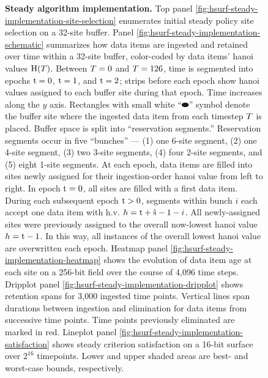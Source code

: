 \begin{figure}[htbp!]
\vspace{-2ex}\caption{%
  \textbf{Steady algorithm implementation.}
  \footnotesize
  Top panel \ref{fig:hsurf-steady-implementation-site-selection} enumerates initial steady policy site selection on a 32-site buffer.
  Panel \ref{fig:hsurf-steady-implementation-schematic} summarizes how data items are ingested and retained over time within a 32-site buffer, color-coded by data items' hanoi values $\colorH(\colorT)$.
  Between $\colorT=0$ and $\colorT=126$, time is segmented into epochs $\colort=0$, $\colort=1$, and $\colort=2$; strips before each epoch show hanoi values assigned to each buffer site during that epoch.
  Time increases along the $y$ axis.
  Rectangles with small white ``$\blkhorzoval$'' symbol denote the buffer site where the ingested data item from each timestep $\colorT$ is placed.
  Buffer space is split into ``reservation segments.''
  Reservation segments occur in five ``bunches'' --- (1) one 6-site segment, (2) one 4-site segment, (3) two 3-site segments, (4) four 2-site segments, and (5) eight 1-site segments.
  At each epoch, data items are filled into sites newly assigned for their ingestion-order hanoi value from left to right.
  In epoch $\colort=0$, all sites are filled with a first data item.
  During each subsequent epoch $\colort>0$, segments within bunch $i$ each accept one data item with h.v. $\colorh=\colort + \colors - 1 - i$.
  All newly-assigned sites were previously assigned to the overall now-lowest hanoi value $\colorh=\colort - 1$.
  In this way, all instances of the overall lowest hanoi value are overwritten each epoch.
  Heatmap panel \ref{fig:hsurf-steady-implementation-heatmap} shows the evolution of data item age at each site on a 256-bit field over the course of 4,096 time steps.
  Dripplot panel \ref{fig:hsurf-steady-implementation-dripplot} shows retention spans for 3,000 ingested time points.
  Vertical lines span durations between ingestion and elimination for data items from successive time points.
  Time points previously eliminated are marked in red.
  Lineplot panel \ref{fig:hsurf-steady-implementation-satisfaction} shows steady criterion satisfaction on a 16-bit surface over $2^{16}$ timepoints.
  Lower and upper shaded areas are best- and worst-case bounds, respectively.
  }
\label{fig:hsurf-steady-implementation}

\end{figure}
